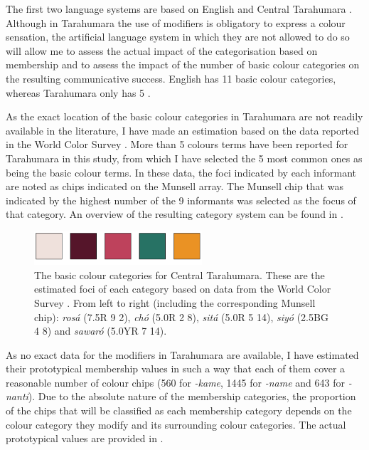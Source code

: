 The first two language systems are based on English
\citep{sturges95location} and Central Tarahumara
\citep{burgress83tarahumara}. Although in Tarahumara the use of
modifiers is obligatory to express a colour sensation, the artificial
language system in which they are not allowed to do so will allow me
to assess the actual impact of the categorisation based on membership
and to assess the impact of the number of basic colour categories on
the resulting communicative success. English has 11 basic colour
categories, whereas Tarahumara only has 5 \citep{kay08number}.

As the exact location of the basic colour categories in Tarahumara are
not readily available in the literature, I have made an estimation
based on the data reported in the World Color Survey
\citep{kay10world}. More than 5 colours terms have been reported for
Tarahumara in this study, from which I have selected the 5 most common
ones as being the basic colour terms. In these data, the foci
indicated by each informant are noted as chips indicated on the
Munsell array. The Munsell chip that was indicated by the highest
number of the 9 informants was selected as the focus of that
category. An overview of the resulting category system can be found in
.

\begin{figure}[htpb]
  \centering
  \includegraphics[height=1.25cm]{./graded-membership/figures/tarahumara-basic-categories.pdf}
  \caption[The basic colour categories for Central Tarahumara]{The
    basic colour categories for Central Tarahumara. These are the
    estimated foci of each category based on data from the World Color
    Survey \citep{kay10world}. From left to right (including the
    corresponding Munsell chip): \textit{ros\'a} (7.5R 9 2), \textit{ch\'o}
    (5.0R 2 8), \textit{sit\'a} (5.0R 5 14), \textit{siy\'o} (2.5BG 4 8) and
    \textit{sawar\'o} (5.0YR 7 14).}
  \label{f:gms-tarahumara-basic}
\end{figure}

As no exact data for the modifiers in Tarahumara are available, I have
estimated their prototypical membership values in such a way that each
of them cover a reasonable number of colour chips (560 for \textit{-kame},
1445 for \textit{-name} and 643 for \textit{-nanti}). Due to the absolute
nature of the membership categories, the proportion of the chips that
will be classified as each membership category depends on the colour
category they modify and its surrounding colour categories. The actual
prototypical values are provided in .

